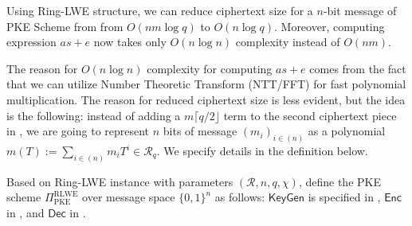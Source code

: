 \documentclass{template}
\begin{document}
\begin{proposition}
    Using Ring-LWE structure, we can reduce ciphertext size for a $n$-bit message
    of PKE Scheme from  from $O(nm\log q)$ to $O(n\log q)$.
    Moreover, computing expression $as+e$ now takes only $O(n\log n)$ complexity
    instead of $O(nm)$.
\end{proposition}

The reason for $O(n\log n)$ complexity for computing $as+e$ comes from the fact
that we can utilize Number Theoretic Transform (NTT/FFT) for fast polynomial
multiplication. The reason for reduced ciphertext size is less evident, but the
idea is the following: instead of adding a $m\lceil q/2 \rfloor$ term to the
second ciphertext piece in , we are going to represent $n$
bits of message $(m_i)_{i \in (n)}$ as a polynomial $m(T) := \sum_{i \in
(n)}m_iT^i \in \mathcal{R}_q$. We specify details in the definition below.

\begin{definition}\label{def:rlwe-pke}
    Based on Ring-LWE instance with parameters $(\mathcal{R}, n, q,\chi)$, define the PKE scheme
    $\Pi_{\text{PKE}}^{\text{RLWE}}$ over message space $\{0,1\}^n$ as follows: $\mathsf{KeyGen}$ is specified in
    , $\mathsf{Enc}$ in , and $\mathsf{Dec}$
    in .
\end{definition}
\end{document}
